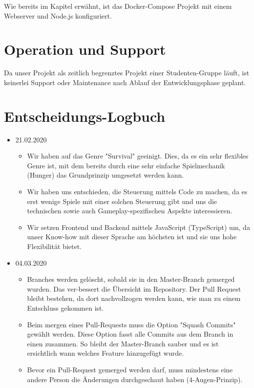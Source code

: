 \documentclass[11pt,a4paper]{scrartcl}
\let\oldsection\section
\renewcommand\section{\clearpage\oldsection}
\begin{document}
Wie bereits im Kapitel \textit{} erwähnt, ist das Docker-Compose Projekt mit einem Webserver und Node.js konfiguriert.

\section{Operation und Support}

Da unser Projekt als zeitlich begrenztes Projekt einer Studenten-Gruppe läuft, ist keinerlei Support oder Maintenance nach Ablauf der Entwicklungsphase geplant.

\section{Entscheidungs-Logbuch}

\begin{itemize}
  \item 21.02.2020
        \begin{itemize}
          \item Wir haben auf das Genre "Survival" geeinigt. Dies, da es ein sehr flexibles Genre ist, mit dem bereits durch eine sehr einfache Spielmechanik (Hunger) das Grundprinzip umgesetzt werden kann.
          \item Wir haben uns entschieden, die Steuerung mittels Code zu machen, da es erst wenige Spiele mit einer solchen Steuerung gibt und uns die technischen sowie auch Gameplay-spezifischen Aspekte interessieren.
          \item Wir setzen Frontend und Backend mittels JavaScript (TypeScript) um, da unser Know-how mit dieser Sprache am höchsten ist und sie uns hohe Flexibilität bietet.
        \end{itemize}
  \item 04.03.2020
        \begin{itemize}
          \item Branches werden gelöscht, sobald sie in den Master-Branch gemerged wurden. Das ver-bessert die Übersicht im Repository. Der Pull Request bleibt bestehen, da dort nachvollzogen werden kann, wie man zu einem Entschluss gekommen ist.
          \item Beim mergen eines Pull-Requests muss die Option "Squash Commits" gewählt werden. Diese Option fasst alle Commits aus dem Branch in einen zusammen. So bleibt der Master-Branch sauber und es ist ersichtlich wann welches Feature hinzugefügt wurde.
          \item Bevor ein Pull-Request gemerged werden darf, muss mindestens eine andere Person die Änderungen durchgeschaut haben (4-Augen-Prinzip).

\end{itemize}
\end{itemize}
\end{document}
